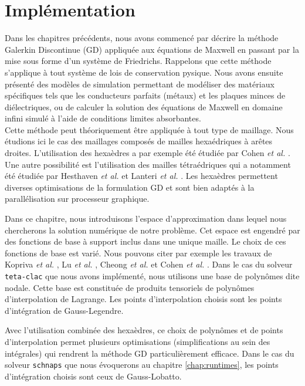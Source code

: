 \chapter{Implémentation}
\label{chap:implementation}


Dans les chapitres précédents, nous avons commencé par décrire
la méthode Galerkin Discontinue (GD) appliquée aux équations de Maxwell en passant
par la mise sous forme d'un système de Friedrichs.
Rappelons que cette méthode s'applique à tout système de lois
de conservation pysique.
Nous avons ensuite présenté des modèles de simulation permettant
de modéliser des matériaux spécifiques tels que les conducteurs parfaits
(métaux) et les plaques minces de diélectriques, ou de calculer
la solution des équations de Maxwell en domaine infini simulé
à l'aide de conditions limites absorbantes.
\\

Cette méthode peut théoriquement être appliquée à
tout type de maillage. Nous étudions ici le cas des maillages
composés de mailles hexaédriques à arêtes droites.
L’utilisation des hexaèdres a par exemple été étudiée par Cohen
\textit{et al.} \cite{Coh-Fer-Per-2006-1}.
Une autre possibilité est l'utilisation des mailles
tétraédriques qui a notamment été étudiée par Hesthaven \textit{et al.}
\cite{Hesthaven:2007:NDG:1557392} et Lanteri \textit{et al.}
\cite{lohrengel:hal-00210500}.
Les hexaèdres permettent diverses optimisations de la formulation GD et
sont bien adaptés à la parallélisation sur processeur graphique.

Dans ce chapitre, nous introduisons l'espace d’approximation
dans lequel nous chercherons la solution numérique de notre problème.
Cet espace est engendré par des fonctions de base à support
inclus dans une unique maille. Le choix de ces fonctions de base
est varié. Nous pouvons citer par exemple les travaux de Kopriva \textit{et al.}
\cite{Kopriva10.1002}, Lu \textit{et al.} \cite{LU2004549}, Cheong \textit{et al.}
\cite{779907} et Cohen \textit{et al.} \cite{Coh-Fer-Per-2006-1}.
Dans le cas du solveur \texttt{teta-clac} que nous avons implémenté, nous utilisons
une base de polynômes dite nodale. Cette base est constituée
de produits tensoriels de polynômes d’interpolation de Lagrange.
Les points d’interpolation choisis sont les points d’intégration de
Gauss-Legendre.

Avec l'utilisation combinée des hexaèdres,
ce choix de polynômes et de points d’interpolation
permet plusieurs optimisations (simplifications au sein des intégrales)
qui rendrent la méthode GD particulièrement efficace.
Dans le cas du solveur \texttt{schnaps} que nous évoquerons au chapitre
\ref{chap:runtimes}, les points d’intégration choisis sont ceux de
Gauss-Lobatto.

